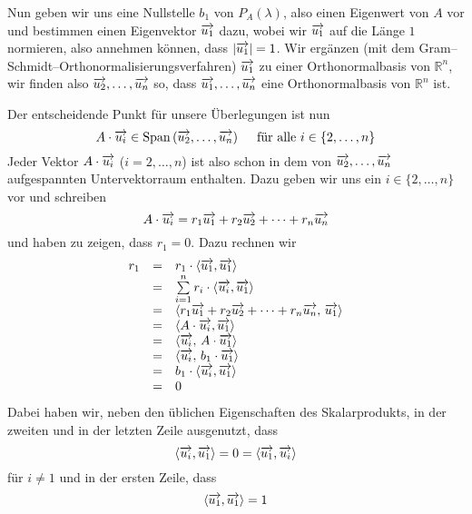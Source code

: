 {Nun geben wir uns eine Nullstelle $b_1$ von $P_A(\lambda)$, also einen Eigenwert von $A$ vor und bestimmen einen 
Eigenvektor $\overrightarrow{u_1}$ dazu, wobei wir $\overrightarrow{u_1}$ auf die Länge $1$ normieren, also 
annehmen können, dass $\vert \overrightarrow{u_1} \vert = 1$. Wir ergänzen (mit dem 
Gram--Schmidt--Orthonormalisierungsverfahren) $\overrightarrow{u_1}$ zu einer Orthonormalbasis von 
$\mathbb R^n$, wir finden also $\overrightarrow{u_2}, \ldots, \overrightarrow{u_n}$ so, dass 
$\overrightarrow{u_1}, \ldots, \overrightarrow{u_n}$ eine Orthonormalbasis von $\mathbb R^n$ ist. 

Der entscheidende Punkt für unsere Überlegungen ist nun 
  	$$ A \cdot \overrightarrow{u_i} \in \mathrm{Span}\left( \overrightarrow{u_2}, \ldots, 
     	\overrightarrow{u_n} \right) \quad  \textrm{ für alle } i \in \{2, \ldots, n\} $$
Jeder Vektor $A \cdot \overrightarrow{u_i}$ ($ i = 2, \ldots, n$) ist also schon in dem von 
$\overrightarrow{u_2}, \ldots,  \overrightarrow{u_n}$ aufgespannten Untervektorraum enthalten. 
Dazu geben wir uns ein $i \in \{2, \ldots , n\} $ vor und schreiben  
  	$$ A \cdot \overrightarrow{u_i} = r_1 \overrightarrow{u_1} + r_2 \overrightarrow{u_2} + \cdots + r_n \overrightarrow{u_n} $$
und haben zu zeigen, dass $r_1 = 0$. Dazu rechnen wir
  	$$ \begin{array} {l c l }
 	r_1 & = & r_1 \cdot \langle \overrightarrow{u_1}, \overrightarrow{u_1} \rangle \\
 	& = & \sum\limits_{i = 1}^{n} r_i \cdot \langle \overrightarrow{u_i}, \overrightarrow{u_1} \rangle \\
 	& = & \langle r_1 \overrightarrow{u_1} +  r_2 \overrightarrow{u_2} + 
  	\cdots + r_n \overrightarrow{u_n}, \,  \overrightarrow{u_1} \rangle  \\
 	& = & \langle A \cdot \overrightarrow{u_i}, \overrightarrow{u_1} \rangle \\
   	& = & \langle\overrightarrow{u_i}, \,  A \cdot \overrightarrow{u_1} \rangle \\
  	& = & \langle\overrightarrow{u_i}, \, b_1 \cdot \overrightarrow{u_1} \rangle \\
 	& = &  b_1 \cdot \langle \overrightarrow{u_i}, \overrightarrow{u_1} \rangle \\
 	& = & 0 
 	\end{array} $$
Dabei haben wir, neben den üblichen Eigenschaften des Skalarprodukts, in der zweiten und in der letzten 
Zeile ausgenutzt, dass
  	$$  \langle \overrightarrow{u_i}, \overrightarrow{u_1} \rangle = 0 = \langle \overrightarrow{u_1}, \overrightarrow{u_i} \rangle  $$
für $i \neq 1$ und in der ersten Zeile, dass
  	$$  \langle \overrightarrow{u_1}, \overrightarrow{u_1} \rangle = 1 $$

}
